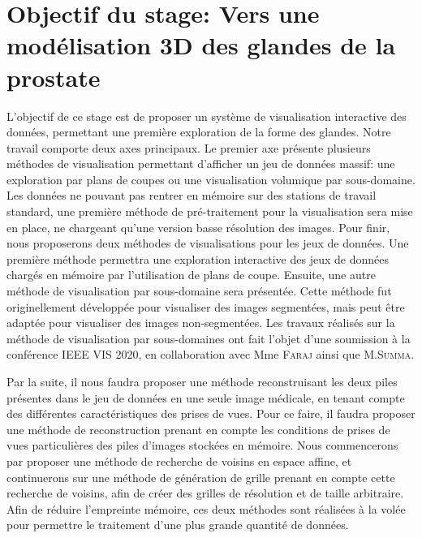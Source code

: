 {\section{Objectif du stage: Vers une modélisation 3D des glandes de la prostate}\label{section:contrib}
    {
        L'objectif de ce stage est de proposer un système de visualisation interactive des données, permettant une première exploration de la forme des glandes. Notre travail comporte deux axes principaux. Le premier axe présente plusieurs méthodes de visualisation permettant d'afficher un jeu de données massif: une exploration par plans de coupes ou une visualisation volumique par sous-domaine. %
        Les données ne pouvant pas rentrer en mémoire sur des stations de travail standard, une première méthode de pré-traitement pour la visualisation sera mise en place, ne chargeant qu'une version basse résolution des images. Pour finir, nous proposerons deux méthodes de visualisations pour les jeux de données. Une première méthode permettra une exploration interactive des jeux de données chargés en mémoire par l'utilisation de plans de coupe. Ensuite, une autre méthode de visualisation par sous-domaine sera présentée. Cette méthode fut originellement développée pour visualiser des images segmentées, mais peut être adaptée pour visualiser des images non-segmentées. Les travaux réalisés sur la méthode de visualisation par sous-domaines ont fait l'objet d'une soumission à la conférence IEEE VIS 2020, en collaboration avec Mme \textsc{Faraj} ainsi que M.\textsc{Summa}.

        Par la suite, il nous faudra proposer une méthode reconstruisant les deux piles présentes dans le jeu de données en une seule image médicale, en tenant compte des différentes caractéristiques des prises de vues. Pour ce faire, il faudra proposer une méthode de reconstruction prenant en compte les conditions de prises de vues particulières des piles d'images stockées en mémoire. Nous commencerons par proposer une méthode de recherche de voisins en espace affine, et continuerons sur une méthode de génération de grille prenant en compte cette recherche de voisins, afin de créer des grilles de résolution et de taille arbitraire. Afin de réduire l'empreinte mémoire, ces deux méthodes sont réalisées à la volée pour permettre le traitement d'une plus grande quantité de données.

}}
